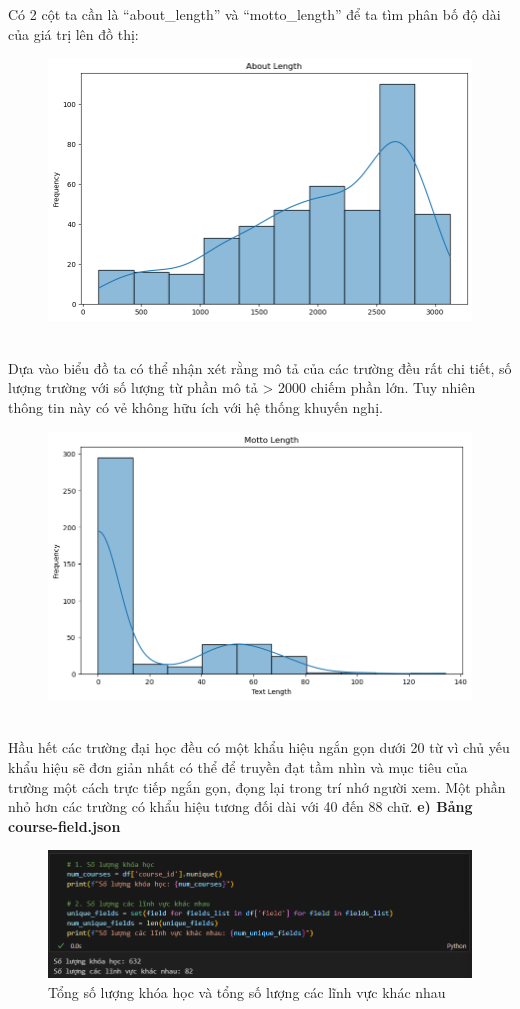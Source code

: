 \newpage
Có 2 cột ta cần là “about\_length” và “motto\_length” để ta tìm phân bố độ dài của giá trị lên đồ thị:
\begin{figure}[h]
    \centering
    \includegraphics[width=0.7\linewidth]{figures/37.png}
\end{figure}\\
Dựa vào biểu đồ ta có thể nhận xét rằng mô tả của các trường đều rất chi tiết, số lượng trường với số lượng từ phần mô tả > 2000  chiếm phần lớn. Tuy nhiên thông tin này có vẻ không hữu ích với hệ thống khuyến nghị.
\begin{figure}[h]
    \centering
    \includegraphics[width=0.7\linewidth]{figures/38.png}
\end{figure}\\
Hầu hết các trường đại học đều có một khẩu hiệu ngắn gọn dưới 20 từ vì chủ yếu khẩu hiệu sẽ đơn giản nhất có thể để truyền đạt tầm nhìn và mục tiêu của trường một cách trực tiếp ngắn gọn, đọng lại trong trí nhớ người xem. Một phần nhỏ hơn các trường có khẩu hiệu tương đối dài với 40 đến 88 chữ. 
\newpage
\textbf{e) Bảng course-field.json}
\begin{figure}[h]
    \centering
    \includegraphics[width=1\linewidth]{figures/39.png}
    \caption{Tổng số lượng khóa học và tổng số lượng các lĩnh vực khác nhau}
\end{figure}
